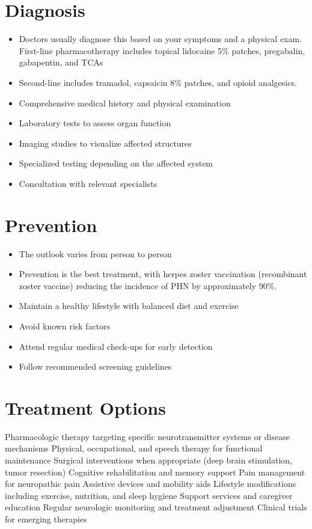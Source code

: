 \section{Diagnosis}
\begin{itemize}[noitemsep]
  \item Doctors usually diagnose this based on your symptoms and a physical exam. First-line pharmacotherapy includes topical lidocaine 5\% patches, pregabalin, gabapentin, and TCAs
  \item Second-line includes tramadol, capsaicin 8\% patches, and opioid analgesics.
  \item Comprehensive medical history and physical examination
  \item Laboratory tests to assess organ function
  \item Imaging studies to visualize affected structures
  \item Specialized testing depending on the affected system
  \item Consultation with relevant specialists
\end{itemize}
\section{Prevention}
\begin{itemize}[noitemsep]
  \item The outlook varies from person to person
  \item Prevention is the best treatment, with herpes zoster vaccination (recombinant zoster vaccine) reducing the incidence of PHN by approximately 90\%.
  \item Maintain a healthy lifestyle with balanced diet and exercise
  \item Avoid known risk factors
  \item Attend regular medical check-ups for early detection
  \item Follow recommended screening guidelines
\end{itemize}
\section{Treatment Options}
Pharmacologic therapy targeting specific neurotransmitter systems or disease mechanisms Physical, occupational, and speech therapy for functional maintenance Surgical interventions when appropriate (deep brain stimulation, tumor resection) Cognitive rehabilitation and memory support Pain management for neuropathic pain Assistive devices and mobility aids Lifestyle modifications including exercise, nutrition, and sleep hygiene Support services and caregiver education Regular neurologic monitoring and treatment adjustment Clinical trials for emerging therapies

